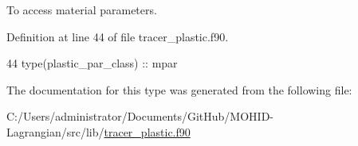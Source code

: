 To access material parameters. 



Definition at line 44 of file tracer\+\_\+plastic.\+f90.


\begin{DoxyCode}
44         \textcolor{keywordtype}{type}(plastic\_par\_class)   :: mpar
\end{DoxyCode}


The documentation for this type was generated from the following file\+:\begin{DoxyCompactItemize}
\item 
C\+:/\+Users/administrator/\+Documents/\+Git\+Hub/\+M\+O\+H\+I\+D-\/\+Lagrangian/src/lib/\mbox{\hyperlink{tracer__plastic_8f90}{tracer\+\_\+plastic.\+f90}}\end{DoxyCompactItemize}
